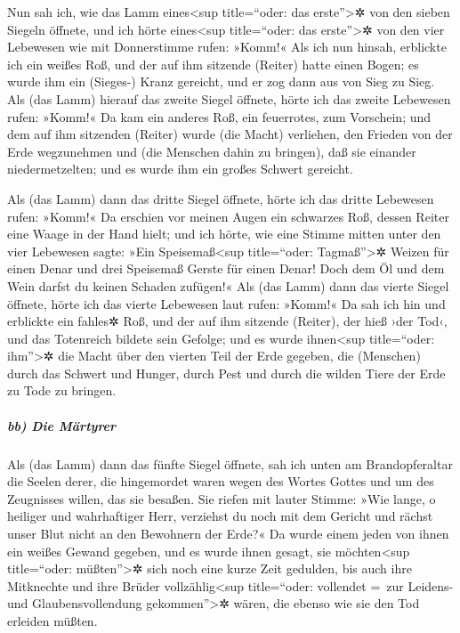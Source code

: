  Nun sah ich, wie das Lamm eines\textless sup
title=``oder: das erste''\textgreater✲ von den sieben Siegeln öffnete,
und ich hörte eines\textless sup title=``oder: das erste''\textgreater✲
von den vier Lebewesen wie mit Donnerstimme rufen: »Komm!«
 Als ich nun hinsah, erblickte ich ein weißes Roß, und der
auf ihm sitzende (Reiter) hatte einen Bogen; es wurde ihm ein (Sieges-)
Kranz gereicht, und er zog dann aus von Sieg zu Sieg.  Als
(das Lamm) hierauf das zweite Siegel öffnete, hörte ich das zweite
Lebewesen rufen: »Komm!«  Da kam ein anderes Roß, ein
feuerrotes, zum Vorschein; und dem auf ihm sitzenden (Reiter) wurde (die
Macht) verliehen, den Frieden von der Erde wegzunehmen und (die Menschen
dahin zu bringen), daß sie einander niedermetzelten; und es wurde ihm
ein großes Schwert gereicht.

 Als (das Lamm) dann das dritte Siegel öffnete, hörte ich
das dritte Lebewesen rufen: »Komm!« Da erschien vor meinen Augen ein
schwarzes Roß, dessen Reiter eine Waage in der Hand hielt;
 und ich hörte, wie eine Stimme mitten unter den vier
Lebewesen sagte: »Ein Speisemaß\textless sup title=``oder:
Tagmaß''\textgreater✲ Weizen für einen Denar und drei Speisemaß Gerste
für einen Denar! Doch dem Öl und dem Wein darfst du keinen Schaden
zufügen!«  Als (das Lamm) dann das vierte Siegel öffnete,
hörte ich das vierte Lebewesen laut rufen: »Komm!«  Da sah
ich hin und erblickte ein fahles✲ Roß, und der auf ihm sitzende
(Reiter), der hieß ›der Tod‹, und das Totenreich bildete sein Gefolge;
und es wurde ihnen\textless sup title=``oder: ihm''\textgreater✲ die
Macht über den vierten Teil der Erde gegeben, die (Menschen) durch das
Schwert und Hunger, durch Pest und durch die wilden Tiere der Erde zu
Tode zu bringen.

\hypertarget{bb-die-muxe4rtyrer}{%
\subparagraph{bb) Die Märtyrer}\label{bb-die-muxe4rtyrer}}

 Als (das Lamm) dann das fünfte Siegel öffnete, sah ich
unten am Brandopferaltar die Seelen derer, die hingemordet waren wegen
des Wortes Gottes und um des Zeugnisses willen, das sie besaßen.
 Sie riefen mit lauter Stimme: »Wie lange, o heiliger und
wahrhaftiger Herr, verziehst du noch mit dem Gericht und rächst unser
Blut nicht an den Bewohnern der Erde?«  Da wurde einem
jeden von ihnen ein weißes Gewand gegeben, und es wurde ihnen gesagt,
sie möchten\textless sup title=``oder: müßten''\textgreater✲ sich noch
eine kurze Zeit gedulden, bis auch ihre Mitknechte und ihre Brüder
vollzählig\textless sup title=``oder: vollendet =~zur Leidens- und
Glaubensvollendung gekommen''\textgreater✲ wären, die ebenso wie sie den
Tod erleiden müßten.

